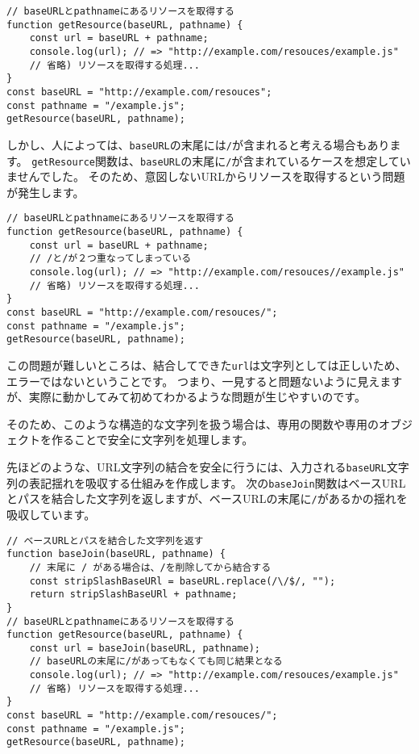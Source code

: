 \begin{lstlisting}
// baseURLとpathnameにあるリソースを取得する
function getResource(baseURL, pathname) {
    const url = baseURL + pathname;
    console.log(url); // => "http://example.com/resouces/example.js"
    // 省略) リソースを取得する処理...
}
const baseURL = "http://example.com/resouces";
const pathname = "/example.js";
getResource(baseURL, pathname);
\end{lstlisting}

しかし、人によっては、\texttt{baseURL}の末尾には\texttt{/}が含まれると考える場合もあります。
\texttt{getResource}関数は、\texttt{baseURL}の末尾に\texttt{/}が含まれているケースを想定していませんでした。
そのため、意図しないURLからリソースを取得するという問題が発生します。

\begin{lstlisting}
// baseURLとpathnameにあるリソースを取得する
function getResource(baseURL, pathname) {
    const url = baseURL + pathname;
    // /と/が２つ重なってしまっている
    console.log(url); // => "http://example.com/resouces//example.js"
    // 省略) リソースを取得する処理...
}
const baseURL = "http://example.com/resouces/";
const pathname = "/example.js";
getResource(baseURL, pathname);
\end{lstlisting}

この問題が難しいところは、結合してできた\texttt{url}は文字列としては正しいため、エラーではないということです。
つまり、一見すると問題ないように見えますが、実際に動かしてみて初めてわかるような問題が生じやすいのです。

そのため、このような構造的な文字列を扱う場合は、専用の関数や専用のオブジェクトを作ることで安全に文字列を処理します。

先ほどのような、URL文字列の結合を安全に行うには、入力される\texttt{baseURL}文字列の表記揺れを吸収する仕組みを作成します。
次の\texttt{baseJoin}関数はベースURLとパスを結合した文字列を返しますが、ベースURLの末尾に\texttt{/}があるかの揺れを吸収しています。

\begin{lstlisting}
// ベースURLとパスを結合した文字列を返す
function baseJoin(baseURL, pathname) {
    // 末尾に / がある場合は、/を削除してから結合する
    const stripSlashBaseURl = baseURL.replace(/\/$/, "");
    return stripSlashBaseURl + pathname;
}
// baseURLとpathnameにあるリソースを取得する
function getResource(baseURL, pathname) {
    const url = baseJoin(baseURL, pathname);
    // baseURLの末尾に/があってもなくても同じ結果となる
    console.log(url); // => "http://example.com/resouces/example.js"
    // 省略) リソースを取得する処理...
}
const baseURL = "http://example.com/resouces/";
const pathname = "/example.js";
getResource(baseURL, pathname);
\end{lstlisting}

